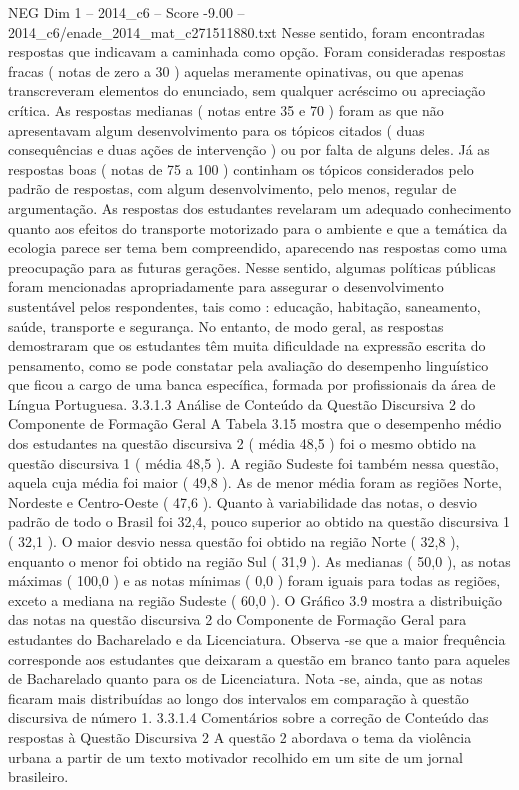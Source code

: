 \begin{textsample}{NEG Dim 1 – 2014\_c6 – Score -9.00 – 2014\_c6/enade\_2014\_mat\_c271511880.txt}
Nesse sentido, foram encontradas respostas que indicavam a caminhada como opção.
Foram consideradas respostas fracas ( notas de zero a 30 ) aquelas meramente opinativas, ou que apenas transcreveram elementos do enunciado, sem qualquer acréscimo ou apreciação crítica.
As respostas medianas ( notas entre 35 e 70 ) foram as que não apresentavam algum desenvolvimento para os tópicos citados ( duas consequências e duas ações de intervenção ) ou por falta de alguns deles.
Já as respostas boas ( notas de 75 a 100 ) continham os tópicos considerados pelo padrão de respostas, com algum desenvolvimento, pelo menos, regular de argumentação.
As respostas dos estudantes revelaram um adequado conhecimento quanto aos efeitos do transporte motorizado para o ambiente e que a temática da ecologia parece ser tema bem compreendido, aparecendo nas respostas como uma preocupação para as futuras gerações.
Nesse sentido, algumas políticas públicas foram mencionadas apropriadamente para assegurar o desenvolvimento sustentável pelos respondentes, tais como : educação, habitação, saneamento, saúde, transporte e segurança.
No entanto, de modo geral, as respostas demostraram que os estudantes têm muita dificuldade na expressão escrita do pensamento, como se pode constatar pela avaliação do desempenho linguístico que ficou a cargo de uma banca específica, formada por profissionais da área de Língua Portuguesa. 3.3.1.3 Análise de Conteúdo da Questão Discursiva 2 do Componente de Formação Geral A Tabela 3.15 mostra que o desempenho médio dos estudantes na questão discursiva 2 ( média 48,5 ) foi o mesmo obtido na questão discursiva 1 ( média 48,5 ).
A região Sudeste foi também nessa questão, aquela cuja média foi maior ( 49,8 ).
As de menor média foram as regiões Norte, Nordeste e Centro-Oeste ( 47,6 ).
Quanto à variabilidade das notas, o desvio padrão de todo o Brasil foi 32,4, pouco superior ao obtido na questão discursiva 1 ( 32,1 ).
O maior desvio nessa questão foi obtido na região Norte ( 32,8 ), enquanto o menor foi obtido na região Sul ( 31,9 ).
As medianas ( 50,0 ), as notas máximas ( 100,0 ) e as notas mínimas ( 0,0 ) foram iguais para todas as regiões, exceto a mediana na região Sudeste ( 60,0 ).
O Gráfico 3.9 mostra a distribuição das notas na questão discursiva 2 do Componente de Formação Geral para estudantes do Bacharelado e da Licenciatura.
Observa -se que a maior frequência corresponde aos estudantes que deixaram a questão em branco tanto para aqueles de Bacharelado quanto para os de Licenciatura.
Nota -se, ainda, que as notas ficaram mais distribuídas ao longo dos intervalos em comparação à questão discursiva de número 1. 3.3.1.4 Comentários sobre a correção de Conteúdo das respostas à Questão Discursiva 2 A questão 2 abordava o tema da violência urbana a partir de um texto motivador recolhido em um site de um jornal brasileiro.

\end{textsample}
